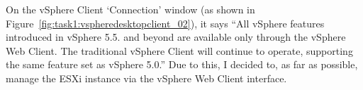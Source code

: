 \noindent On the vSphere Client `Connection' window (as shown in Figure~\ref{fig:task1:vspheredesktopclient_02}), it says ``All vSphere features introduced in vSphere 5.5. and beyond are available only through the vSphere Web Client. The traditional vSphere Client will continue to operate, supporting the same feature set as vSphere 5.0.'' Due to this, I decided to, as far as possible, manage the ESXi instance via the vSphere Web Client interface.
